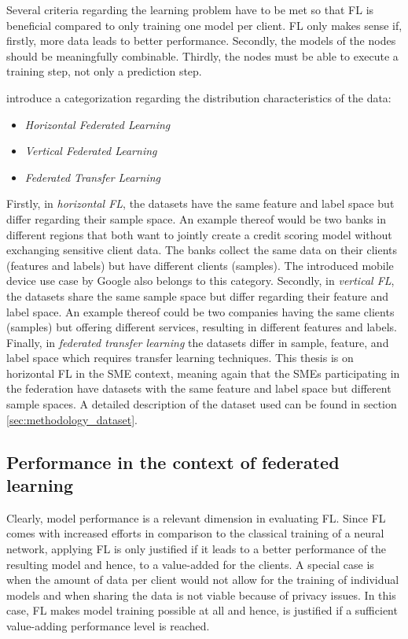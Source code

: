 Several criteria regarding the learning problem have to be met so that FL is beneficial compared to only training one model per client. FL only makes sense if, firstly, more data leads to better performance. Secondly, the models of the nodes should be meaningfully combinable. Thirdly, the nodes must be able to execute a training step, not only a prediction step.

\citet{yang2019federated} introduce a categorization regarding the distribution characteristics of the data:
\begin{itemize}
    \item \emph{Horizontal Federated Learning}
    \item \emph{Vertical Federated Learning}
    \item \emph{Federated Transfer Learning}
\end{itemize}
Firstly, in \emph{horizontal FL}, the datasets have the same feature and label space but differ regarding their sample space. An example thereof would be two banks in different regions that both want to jointly create a credit scoring model without exchanging sensitive client data. The banks collect the same data on their clients (features and labels) but have different clients (samples). The introduced mobile device use case by Google \citep{mcmahan2017communication} also belongs to this category. Secondly, in \emph{vertical FL}, the datasets share the same sample space but differ regarding their feature and label space. An example thereof could be two companies having the same clients (samples) but offering different services, resulting in different features and labels. Finally, in \emph{federated transfer learning} the datasets differ in sample, feature, and label space which requires transfer learning techniques. This thesis is on horizontal FL in the SME context, meaning again that the SMEs participating in the federation have datasets with the same feature and label space but different sample spaces. A detailed description of the dataset used can be found in section \ref{sec:methodology_dataset}.

\subsection{Performance in the context of federated learning\label{sec:literature_performance}}
Clearly, model performance is a relevant dimension in evaluating FL. Since FL comes with increased efforts in comparison to the classical training of a neural network, applying FL is only justified if it leads to a better performance of the resulting model and hence, to a value-added for the clients. A special case is when the amount of data per client would not allow for the training of individual models and when sharing the data is not viable because of privacy issues. In this case, FL makes model training possible at all and hence, is justified if a sufficient value-adding performance level is reached.

